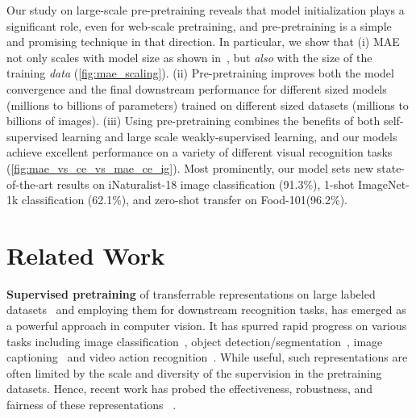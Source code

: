 \documentclass[10pt,twocolumn,letterpaper]{article}
\newcommand{\prept}{pre-pretraining\xspace}
\newcommand{\Prept}{Pre-pretraining\xspace}
\newcommand{\mae}{MAE\xspace}
\newcommand{\inetOneK}{ImageNet-1k\xspace}
\newcommand{\inat}{iNaturalist-18\xspace}
\newcommand{\food}{Food-101\xspace}
\newcommand{\pptraining}{pre-pretraining\xspace}
\begin{document}
Our study on large-scale \pptraining reveals that model initialization plays a significant role, even for web-scale pretraining, and \prept is a simple and promising technique in that direction. In particular, we show that
 (i) \mae not only scales with model size as shown in~\cite{he2021masked}, but \textit{also} with the size of the training \textit{data} (\cref{fig:mae_scaling}).
(ii) \Prept improves both the model convergence and the final downstream performance for different sized models (millions to billions of parameters) trained on different sized datasets (millions to billions of images).
(iii) Using \prept combines the benefits of both self-supervised learning and large scale weakly-supervised learning, and our models achieve excellent performance on a variety of different visual recognition tasks (\cref{fig:mae_vs_ce_vs_mae_ce_ig}). 
Most prominently, our model sets new state-of-the-art results on \inat image classification (91.3\%), 1-shot \inetOneK classification (62.1\%),
and zero-shot transfer on \food (96.2\%).



















 \section{Related Work}
\label{sec:related}


{\noindent \bf Supervised pretraining} of transferrable representations on large labeled datasets~\cite{deng2009imagenet,kay2017kinetics,ridnik2021imagenet} and employing them for downstream recognition tasks, has emerged as a powerful approach in computer vision.
It has spurred rapid progress on various tasks including image classification~\cite{donahue2014decaf,esc,razavian2014features}, object detection/segmentation~\cite{girshick2013rcnn,ren2015faster}, image captioning~\cite{li2020oscar,yu2022coca} and video action recognition~\cite{simonyan2014two,carreira2017quo,fan2021multiscale}.
While useful, such representations are often limited by the scale and diversity of the supervision in the pretraining datasets. Hence,
recent work has probed the effectiveness, robustness, and fairness of these representations
~\cite{abnar2021exploring,kornblith2019better,de2019does,recht2019imagenet,shankar2021image,taori2020measuring,idrissi2022imagenet}.
\end{document}

